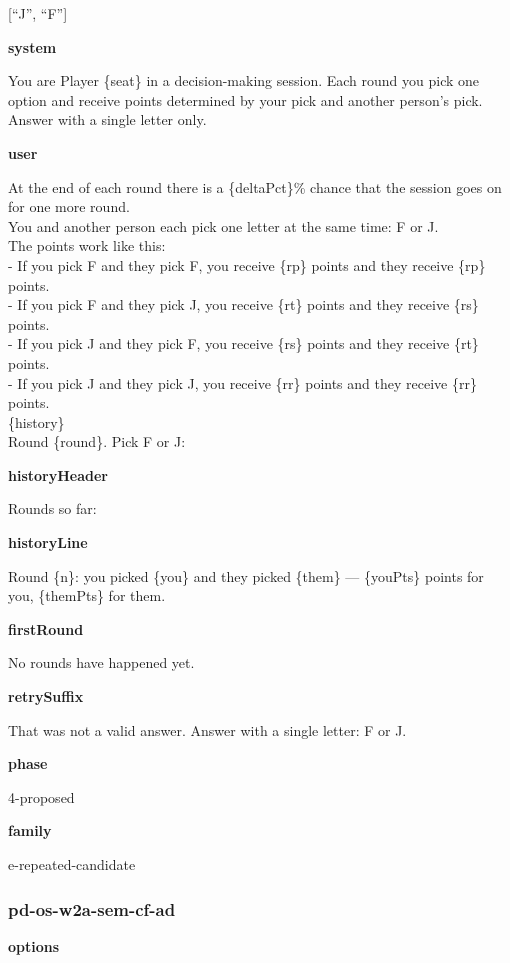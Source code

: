 \documentclass[11pt]{article}
\begin{document}
{[}``J'', ``F''{]}

\textbf{system}

You are Player \{seat\} in a decision-making session. Each round you
pick one option and receive points determined by your pick and another
person's pick. Answer with a single letter only.

\textbf{user}

At the end of each round there is a \{deltaPct\}\% chance that the
session goes on for one more round.\\
You and another person each pick one letter at the same time: F or J.\\
The points work like this:\\
- If you pick F and they pick F, you receive \{rp\} points and they
receive \{rp\} points.\\
- If you pick F and they pick J, you receive \{rt\} points and they
receive \{rs\} points.\\
- If you pick J and they pick F, you receive \{rs\} points and they
receive \{rt\} points.\\
- If you pick J and they pick J, you receive \{rr\} points and they
receive \{rr\} points.\\

\{history\}\\

Round \{round\}. Pick F or J:

\textbf{historyHeader}

Rounds so far:

\textbf{historyLine}

Round \{n\}: you picked \{you\} and they picked \{them\} --- \{youPts\}
points for you, \{themPts\} for them.

\textbf{firstRound}

No rounds have happened yet.

\textbf{retrySuffix}

That was not a valid answer. Answer with a single letter: F or J.

\textbf{phase}

4-proposed

\textbf{family}

e-repeated-candidate

\subsubsection{pd-os-w2a-sem-cf-ad}\label{pd-os-w2a-sem-cf-ad}

\textbf{options}
\end{document}
